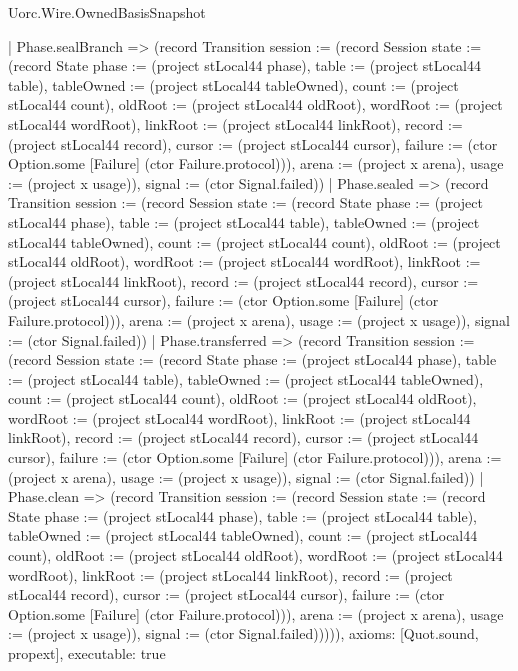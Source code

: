 \begin{lexlean}{Uorc.Wire.OwnedBasisSnapshot}
\begin{semanticmodule}
{      | Phase.sealBranch => (record Transition {session := (record Session {state := (record State {phase := (project stLocal44 phase), table := (project stLocal44 table), tableOwned := (project stLocal44 tableOwned), count := (project stLocal44 count), oldRoot := (project stLocal44 oldRoot), wordRoot := (project stLocal44 wordRoot), linkRoot := (project stLocal44 linkRoot), record := (project stLocal44 record), cursor := (project stLocal44 cursor), failure := (ctor Option.some [Failure] (ctor Failure.protocol))}), arena := (project x arena), usage := (project x usage)}), signal := (ctor Signal.failed)})
      | Phase.sealed => (record Transition {session := (record Session {state := (record State {phase := (project stLocal44 phase), table := (project stLocal44 table), tableOwned := (project stLocal44 tableOwned), count := (project stLocal44 count), oldRoot := (project stLocal44 oldRoot), wordRoot := (project stLocal44 wordRoot), linkRoot := (project stLocal44 linkRoot), record := (project stLocal44 record), cursor := (project stLocal44 cursor), failure := (ctor Option.some [Failure] (ctor Failure.protocol))}), arena := (project x arena), usage := (project x usage)}), signal := (ctor Signal.failed)})
      | Phase.transferred => (record Transition {session := (record Session {state := (record State {phase := (project stLocal44 phase), table := (project stLocal44 table), tableOwned := (project stLocal44 tableOwned), count := (project stLocal44 count), oldRoot := (project stLocal44 oldRoot), wordRoot := (project stLocal44 wordRoot), linkRoot := (project stLocal44 linkRoot), record := (project stLocal44 record), cursor := (project stLocal44 cursor), failure := (ctor Option.some [Failure] (ctor Failure.protocol))}), arena := (project x arena), usage := (project x usage)}), signal := (ctor Signal.failed)})
      | Phase.clean => (record Transition {session := (record Session {state := (record State {phase := (project stLocal44 phase), table := (project stLocal44 table), tableOwned := (project stLocal44 tableOwned), count := (project stLocal44 count), oldRoot := (project stLocal44 oldRoot), wordRoot := (project stLocal44 wordRoot), linkRoot := (project stLocal44 linkRoot), record := (project stLocal44 record), cursor := (project stLocal44 cursor), failure := (ctor Option.some [Failure] (ctor Failure.protocol))}), arena := (project x arena), usage := (project x usage)}), signal := (ctor Signal.failed)})))),
  axioms: [Quot.sound, propext],
  executable: true
}


\end{semanticmodule}
\end{lexlean}
